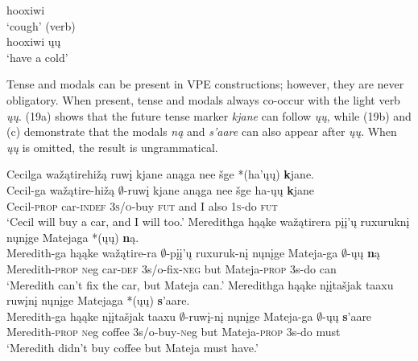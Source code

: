 \documentclass[output=paper]{LSP/langsci}
\begin{document}
\begin{exe}
\ex
\begin{multicols}{2}
\begin{xlist}
\ex
hooxiwi\\
`cough' (verb)\\

\ex
hooxiwi ųų\\
`have a cold'
\end{xlist}
\end{multicols}
\end{exe}

Tense and modals can be present in VPE constructions; however, they are never obligatory. When present, tense and modals always co-occur with the light verb \emph{ųų}. (19a) shows that the future tense marker \emph{kjane} can follow \emph{ųų}, while (19b) and (c) demonstrate that the modals \emph{ną} and \emph{s'aare} can also appear after \emph{ųų}. When \emph{ųų} is omitted, the result is ungrammatical.

\begin{exe}
\ex
\begin{xlist}
\ex
\glll Cecilga wažątirehižą ruwį kjane anąga nee šge *(ha'ųų) {\textbf kjane}.\\
Cecil-ga wažątire-hižą $\emptyset$-ruwį kjane anąga nee šge ha-ųų {\textbf kjane}\\
Cecil-\textsc{prop} car-\textsc{indef} \textsc{3s/o}-buy \textsc{fut} and I also \textsc{1s}-do \textsc{fut}\\
\trans `Cecil will buy a car, and I will too.' 
\ex
\glll Meredithga hąąke wažątirera {pįį'ų ruxuruknį} nųnįge Matejaga *(ųų) {\textbf ną}.\\
Meredith-ga hąąke wažątire-ra {$\emptyset$-pįį'ų ruxuruk-nį} nųnįge Mateja-ga $\emptyset$-ųų {\textbf ną}\\
Meredith-\textsc{prop} {\textsc neg} car-\textsc{def} {\textsc 3s/o}-fix-\textsc{neg} but Mateja-\textsc{prop} {\textsc 3s}-do can\\
\trans `Meredith can't fix the car, but Mateja can.'
\ex
\glll Meredithga hąąke {nįįtašjak taaxu} ruwįnį nųnįge Matejaga *(ųų) {\textbf s'aare}.\\ 
Meredith-ga hąąke {nįįtašjak taaxu} $\emptyset$-ruwį-nį nųnįge Mateja-ga $\emptyset$-ųų {\textbf s'aare}\\
Meredith-\textsc{prop} {\textsc neg} coffee {\textsc 3s/o}-buy-{\textsc neg} but Mateja-\textsc{prop} {\textsc 3s}-do must\\
\trans `Meredith didn't buy coffee but Mateja must have.' 
\end{xlist}
\end{exe}
\end{document}

